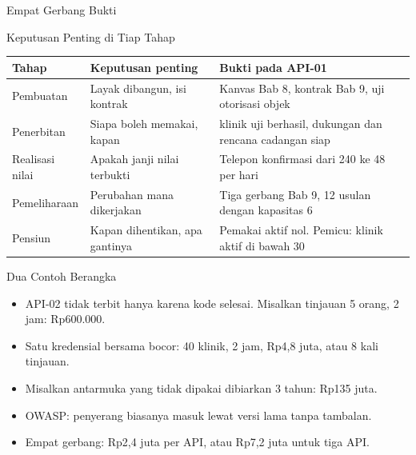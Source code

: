 \documentclass[aspectratio=169, table, 12pt]{beamer}
\begin{document}
\begin{frame}{{\Large Empat Gerbang Bukti}}
  \centering
\end{frame}

\begin{frame}{{\Large Keputusan Penting di Tiap Tahap}}
  \footnotesize
  \begin{tabularx}{\textwidth}{>{\raggedright\arraybackslash}p{2.3cm} >{\raggedright\arraybackslash}p{4.2cm} >{\raggedright\arraybackslash}X}
    \hline
    \textbf{Tahap} & \textbf{Keputusan penting} & \textbf{Bukti pada API-01} \\ \hline
    Pembuatan & Layak dibangun, isi kontrak & Kanvas Bab 8, kontrak Bab 9, uji otorisasi objek \\ \hline
    Penerbitan & Siapa boleh memakai, kapan & 5 klinik uji berhasil, dukungan dan rencana cadangan siap \\ \hline
    Realisasi nilai & Apakah janji nilai terbukti & Telepon konfirmasi dari 240 ke 48 per hari \\ \hline
    Pemeliharaan & Perubahan mana dikerjakan & Tiga gerbang Bab 9, 12 usulan dengan kapasitas 6 \\ \hline
    Pensiun & Kapan dihentikan, apa gantinya & Pemakai aktif nol. Pemicu: klinik aktif di bawah 30 \\ \hline
  \end{tabularx}
\end{frame}

\begin{frame}{{\Large Dua Contoh Berangka}}
  \vspace{8pt}
  \begin{itemize}
    \item API-02 tidak terbit hanya karena kode selesai. Misalkan tinjauan 5 orang, 2 jam: Rp600.000.
    \item Satu kredensial bersama bocor: 40 klinik, 2 jam, Rp4,8 juta, atau 8 kali tinjauan.
    \item Misalkan antarmuka yang tidak dipakai dibiarkan 3 tahun: Rp135 juta.
    \item OWASP: penyerang biasanya masuk lewat versi lama tanpa tambalan.
    \item Empat gerbang: Rp2,4 juta per API, atau Rp7,2 juta untuk tiga API.
  \end{itemize}
\end{frame}
\end{document}
